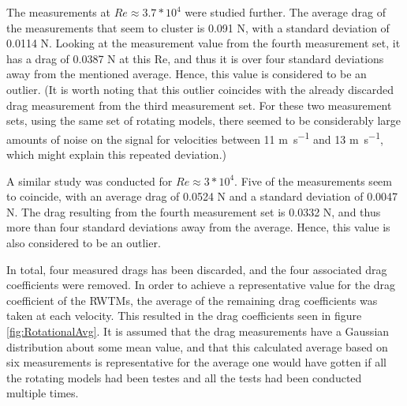 The measurements at $Re \approx 3.7*10^4$ were studied further. The average drag of the measurements that seem to cluster is 0.091 \si{\newton}, with a standard deviation of 0.0114 \si{\newton}. Looking at the measurement value from the fourth measurement set, it has a drag of 0.0387 \si{\newton} at this Re, and thus it is over four standard deviations away from the mentioned average. Hence, this value is considered to be an outlier. (It is worth noting that this outlier coincides with the already discarded drag measurement from the third measurement set. For these two measurement sets, using the same set of rotating models, there seemed to be considerably large amounts of noise on the signal for velocities between 11 \si{\m\per\s} and 13 \si{\m\per\s}, which might explain this repeated deviation.) 

A similar study was conducted for $Re \approx 3*10^4$. Five of the measurements seem to coincide, with an average drag of 0.0524 \si{\newton} and a standard deviation of 0.0047 \si{\newton}. The drag resulting from the fourth measurement set is 0.0332 \si{\newton}, and thus more than four standard deviations away from the average. Hence, this value is also considered to be an outlier.  

In total, four measured drags has been discarded, and the four associated drag coefficients were removed. In order to achieve a representative value for the drag coefficient of the \gls{RWTM}s, the average of the remaining drag coefficients was taken at each velocity. This resulted in the drag coefficients seen in figure \ref{fig:RotationalAvg}. It is assumed that the drag measurements have a Gaussian distribution about some mean value, and that this calculated average based on six measurements is representative for the average one would have gotten if all the rotating models had been testes and all the tests had been conducted multiple times.  


